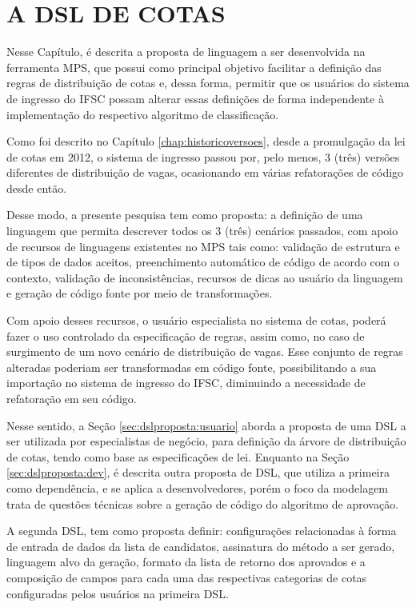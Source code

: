 \chapter{A DSL DE COTAS}
\label{chap:dslcotas}

   Nesse Capítulo, é descrita a proposta de linguagem a ser desenvolvida na ferramenta \gls{MPS}, que possui como principal objetivo facilitar a definição das regras de distribuição de cotas e, dessa forma, permitir que os usuários do sistema de ingresso do \gls{IFSC} possam alterar essas definições de forma independente à implementação do respectivo algoritmo de classificação.
   
   Como foi descrito no Capítulo \ref{chap:historicoversoes}, desde a promulgação da lei de cotas em 2012, o sistema de ingresso passou por, pelo menos, 3 (três) versões diferentes de distribuição de vagas, ocasionando em várias refatorações de código desde então. 
   
   Desse modo, a presente pesquisa tem como proposta: a definição de uma linguagem que permita descrever todos os 3 (três) cenários passados, com apoio de recursos de linguagens existentes no \gls{MPS} tais como: validação de estrutura e de tipos de dados aceitos, preenchimento automático de código de acordo com o contexto, validação de inconsistências, recursos de dicas ao usuário da linguagem e geração de código fonte por meio de transformações. 
   
   Com apoio desses recursos, o usuário especialista no sistema de cotas, poderá fazer o uso controlado da especificação de regras, assim como, no caso de surgimento de um novo cenário de distribuição de vagas. Esse conjunto de regras alteradas poderiam ser transformadas em código fonte, possibilitando a  sua importação no sistema de ingresso do \gls{IFSC}, diminuindo a necessidade de refatoração em seu código.
   
   Nesse sentido, a Seção \ref{sec:dslproposta:usuario} aborda a proposta de uma \gls{DSL} a ser utilizada por especialistas de negócio, para definição da árvore de distribuição de cotas, tendo como base as especificações de lei. Enquanto na Seção \ref{sec:dslproposta:dev}, é descrita outra proposta de \gls{DSL}, que utiliza a primeira como dependência, e se aplica a desenvolvedores, porém o foco da modelagem trata de questões técnicas sobre a geração de código do algoritmo de aprovação.
   
   A segunda \gls{DSL}, tem como proposta definir: configurações relacionadas à forma de entrada de dados da lista de candidatos, assinatura do método a ser gerado, linguagem alvo da geração, formato da lista de retorno dos aprovados e a composição de campos para cada uma das respectivas categorias de cotas configuradas pelos usuários na primeira \gls{DSL}.
   
   

  
 
